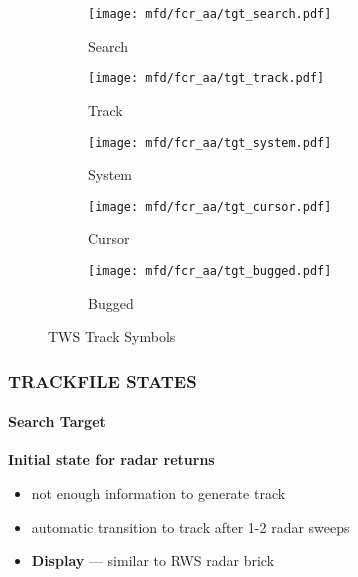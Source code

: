 \begin{figure}[htbp]
    \centering
    \begin{subfigure}[b]{0.15\linewidth}
        \centering
        \texttt{[image: mfd/fcr\_aa/tgt\_search.pdf]}
        \caption{Search}
        \label{fig:sensorsaa:apg68:tws:trackfile:search}
    \end{subfigure}
    \begin{subfigure}[b]{0.15\linewidth}
        \centering
        \texttt{[image: mfd/fcr\_aa/tgt\_track.pdf]}
        \caption{Track}
        \label{fig:sensorsaa:apg68:tws:trackfile:track}
    \end{subfigure}
    \begin{subfigure}[b]{0.15\linewidth}
        \centering
        \texttt{[image: mfd/fcr\_aa/tgt\_system.pdf]}
        \caption{System}
        \label{fig:sensorsaa:apg68:tws:trackfile:system}
    \end{subfigure}
    \begin{subfigure}[b]{0.15\linewidth}
        \centering
        \texttt{[image: mfd/fcr\_aa/tgt\_cursor.pdf]}
        \caption{Cursor}
        \label{fig:sensorsaa:apg68:tws:trackfile:cursor}
    \end{subfigure}
    \begin{subfigure}[b]{0.15\linewidth}
        \centering
        \texttt{[image: mfd/fcr\_aa/tgt\_bugged.pdf]}
        \caption{Bugged}
        \label{fig:sensorsaa:apg68:tws:trackfile:bugged}
    \end{subfigure}
    \caption{TWS Track Symbols}
    \label{fig:sensorsaa:apg68:tws:trackfile}
\end{figure}

\subsubsection{TRACKFILE STATES}
\label{subsec:sensorsaa:apg68:tws:trackfile}

\paragraph{Search Target}
\textbf{Initial state for radar returns}
\begin{itemize}
    \item not enough information to generate track
    \item automatic transition to track after 1-2 radar sweeps
    \item \textbf{Display} --- similar to RWS radar brick
\end{itemize}

